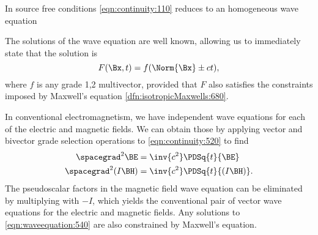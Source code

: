 
%
In source free conditions \cref{eqn:continuity:110} reduces to an homogeneous wave equation

The solutions of the wave equation are well known, allowing us to immediately state that the solution is
\begin{dmath}\label{eqn:continuity:560}
F(\Bx, t) = f(\Norm{\Bx} \pm c t),
\end{dmath}
where \( f \) is any grade 1,2 multivector, provided that \( F \) also satisfies the constraints imposed by
Maxwell's equation \cref{dfn:isotropicMaxwells:680}.

In conventional electromagnetism, we have independent wave equations for
each of the electric and magnetic fields.
We can obtain those by applying vector and bivector grade selection operations to
\cref{eqn:continuity:520} to find
\begin{dmath}\label{eqn:waveequation:540}
\begin{aligned}
\spacegrad^2 \BE &= \inv{c^2} \PDSq{t}{\BE} \\
\spacegrad^2 (I \BH) &= \inv{c^2} \PDSq{t}{(I \BH)}.
\end{aligned}
\end{dmath}
The pseudoscalar factors in the magnetic field wave equation can be eliminated by multiplying with
\( -I \), which yields the conventional pair of vector wave equations for the electric and magnetic fields.  Any solutions
to
\cref{eqn:waveequation:540} are also constrained by Maxwell's equation.
